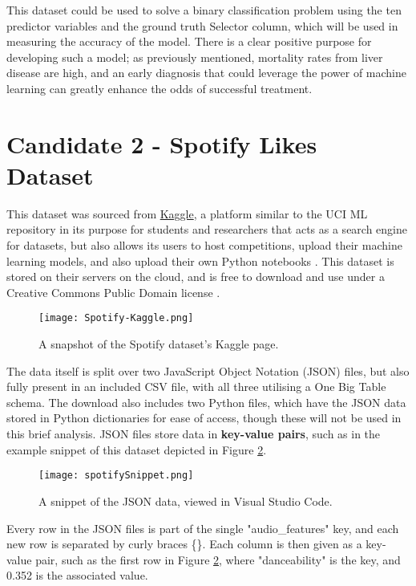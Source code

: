 This dataset could be used to solve a binary classification problem using the ten predictor 
variables and the ground truth Selector column, which will be used in measuring the accuracy of the model. There is a clear 
positive purpose for developing such a model; as previously mentioned, mortality rates from liver disease are high, and an early
diagnosis that could leverage the power of machine learning can greatly enhance the odds of successful treatment.

\pagebreak

\section{Candidate 2 - Spotify Likes Dataset}
This dataset \autocite{vergnou_spotify_nodate} was sourced from \href{https://www.kaggle.com/datasets}{Kaggle}, a platform similar to the UCI ML repository in its 
purpose for students and researchers that acts as a search engine for datasets, but also allows its users to host competitions, upload their machine learning models, and also upload 
their own Python notebooks \autocite{kaggle_kaggle_nodate}. This dataset is stored on their servers on the cloud, and is free to download and use under a 
Creative Commons Public Domain license \autocite{creative_commons_deed_nodate}.

\begin{figure}[H]
    \centering
    \texttt{[image: Spotify-Kaggle.png]}
    \caption{A snapshot of the Spotify dataset's Kaggle page.}
    \label{fig:Spotify-Kaggle}
\end{figure}

The data itself is split over 
two JavaScript Object Notation (JSON) files, but also fully present in an included CSV file, with all three utilising a One Big Table schema. The 
download also includes two Python files, which have the JSON data stored in Python dictionaries for ease of access, though these will not be used in 
this brief analysis. JSON files store data in \textbf{key-value pairs}, such as in the example snippet of this dataset depicted in Figure \ref{fig:spotifySnippet}.  

\begin{figure}[H]
    \centering
    \texttt{[image: spotifySnippet.png]}
    \caption{A snippet of the JSON data, viewed in Visual Studio Code.}
    \label{fig:spotifySnippet}
\end{figure}

Every row in the JSON files is part of the single "audio\_features" key, and each new row is separated by curly braces \{\}. Each column is then given as a 
key-value pair, such as the first row in Figure \ref{fig:spotifySnippet}, where "danceability" is the key, and 0.352 is the associated value.

